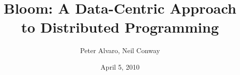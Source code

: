 \documentclass{article}
\begin{document}
\title{Bloom: A Data-Centric Approach to Distributed Programming}
\author{Peter Alvaro, Neil Conway}
\date{April 5, 2010}

\maketitle
\thispagestyle{empty}
\pagestyle{empty}






\newpage


\end{document}

